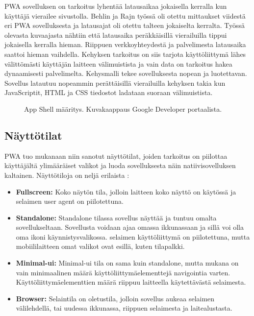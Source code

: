 \documentclass{tktltiki}
\begin{document}
PWA sovelluksen on tarkoitus lyhentää latausaikaa jokaisella kerralla kun käyttäjä vierailee sivustolla. Behlin ja Rajn työssä \cite{8441701} oli otettu mittaukset viidestä eri PWA sovelluksesta ja latausajat oli otettu talteen jokaiselta kerralta. Työssä olevasta kuvaajasta nähtiin että latausaika peräkkäisillä vierailuilla tippui jokaisella kerralla hieman. Riippuen verkkoyhteydestä ja palvelimesta latausaika saattoi hieman vaihdella. Kehyksen tarkoitus on siis tarjota käyttöliittymä lähes välittömästi käyttäjän laitteen välimuistista ja vain data on tarkoitus hakea dynaamisesti palvelimelta. Kehysmalli tekee sovelluksesta nopean ja luotettavan. Sovellus latautuu nopeammin perättäisillä vierailuilla kehyksen takia kun JavaScriptit, HTML ja CSS tiedostot ladataan suoraan välimuistista.

\begin{figure}[h]
\begin{center}
\caption{App Shell määritys. Kuvakaappaus Google Developer portaalista. }
\label{Service workerin toiminta}
\end{center}
\end{figure}
\clearpage


\subsection{Näyttötilat}

PWA tuo mukanaan niin sanotut näyttötilat, joiden tarkoitus on piilottaa käyttäjältä ylimääräiset valikot ja luoda sovelluksesta näin natiivisovelluksen kaltainen. Näyttötiloja on neljä erilaista \cite{Mozilla}:

\begin{itemize}
  \item \textbf{Fullscreen:} Koko näytön tila, jolloin laitteen koko näyttö on käytössä ja selaimen user agent on piilotettuna.
  \item \textbf{Standalone:} Standalone tilassa sovellus näyttää ja tuntuu omalta sovellukseltaan. Sovellusta voidaan ajaa omassa ikkunassaan ja sillä voi olla oma ikoni käynnistysvalikossa. selaimen käyttöliittymä on piilotettuna, mutta mobiililaitteen omat valikot ovat esillä, kuten tilapalkki. 
  \item \textbf{Minimal-ui:} Minimal-ui tila on sama kuin standalone, mutta mukana on vain minimaalinen määrä käyttöliittymäelementtejä navigointia varten. Käyttöliittymäelementtien määrä riippuu laitteella käytettävästä selaimesta. 
  \item \textbf{Browser:} Selaintila on oletustila, jolloin sovellus aukeaa selaimen välilehdellä, tai uudessa ikkunassa, riippuen selaimesta ja laitealustasta. 
\end{itemize}
\end{document}

